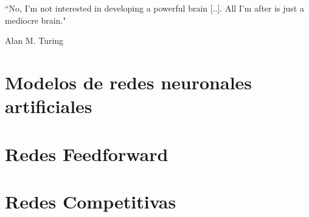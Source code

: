 
\epigraph{``No, I'm not interested in developing a powerful brain [..]. All I'm after is just a mediocre brain."}{Alan M. Turing}


\section{Modelos de redes neuronales artificiales}

\section{Redes Feedforward}

\section{Redes Competitivas}

